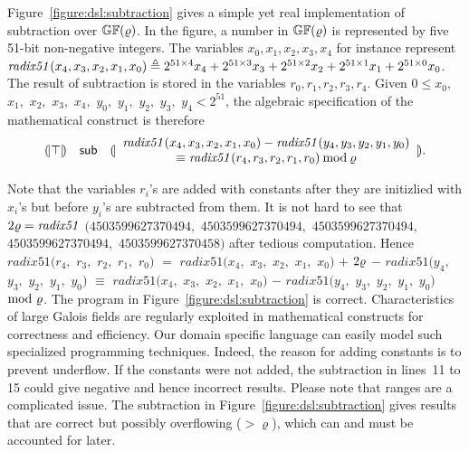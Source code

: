 Figure~\ref{figure:dsl:subtraction} gives a simple yet real
implementation of subtraction over $\mathbb{GF}(\varrho)$. 
In the figure, a number in $\mathbb{GF}(\varrho)$ 
is represented by five 51-bit non-negative integers. The variables
${x}_0, {x}_1, {x}_2, {x}_3, {x}_4$ for instance represent 
$\mathit{radix51}({x}_4, {x}_3, {x}_2, {x}_1, {x}_0) \triangleq
2^{51 \times 4} {x}_4 + 2^{51 \times 3} {x}_3 + 
2^{51 \times 2} {x}_2 + 2^{51 \times 1} {x}_1 + 
2^{51 \times 0} {x}_0$. The result of
subtraction is stored in the variables ${r}_0, {r}_1, {r}_2, {r}_3, {r}_4$. 
Given $0 \leq {x}_0,$ ${x}_1,$ ${x}_2,$ ${x}_3,$ ${x}_4,$ ${y}_0,$ 
${y}_1,$ ${y}_2,$ ${y}_3,$ ${y}_4 < 2^{51}$, 
the algebraic specification of the mathematical construct is therefore
\[
\begin{array}{rcl}
{(\!|}{\top}{|\!)} &
\mbox{\textsf{sub}} &
{(\!|}{
   \begin{array}{c}
     \mathit{radix51}({x}_4, {x}_3, {x}_2, {x}_1, {x}_0) -
     \mathit{radix51}({y}_4, {y}_3, {y}_2, {y}_1, {y}_0)\\
     \equiv 
     \mathit{radix51}({r}_4, {r}_3, {r}_2, {r}_1, {r}_0)
     \mathbin{\textmd{mod}} \varrho
   \end{array}
}{|\!)}.
\end{array}
\]

Note that the variables ${r}_i$'s are added with constants
after they are initizlied with ${x}_i$'s but before
${y}_i$'s are subtracted from them. It is not hard to see that
$2\varrho = \mathit{radix51}$ $(4503599627370494,$ $4503599627370494,$
$4503599627370494,$ $4503599627370494,$ $4503599627370458)$
after tedious computation. Hence $\mathit{radix51}({r}_4,$
${r}_3,$ ${r}_2,$ ${r}_1,$ ${r}_0)$ $=$
$\mathit{radix51}({x}_4,$ ${x}_3,$ ${x}_2,$ ${x}_1,$ ${x}_0)$ $+$ 
$2 \varrho $ $-$
$\mathit{radix51}({y}_4,$ ${y}_3,$ ${y}_2,$ ${y}_1,$ ${y}_0)$ 
$\equiv $
$\mathit{radix51}({x}_4,$ ${x}_3,$ ${x}_2,$ ${x}_1,$ ${x}_0)$ $-$
$\mathit{radix51}({y}_4,$ ${y}_3,$ ${y}_2,$ ${y}_1,$ ${y}_0)$ $\mathbin{\textmd{mod}} 
\ \varrho$. The program in
Figure~\ref{figure:dsl:subtraction} is correct. 
Characteristics of large Galois fields are
regularly exploited in mathematical constructs for correctness and
efficiency. Our domain specific language can easily model such
specialized programming techniques. Indeed,
the reason for
adding constants is to prevent underflow. If the constants were not
added, the subtraction in lines~11 to 15 could give negative and hence
%
incorrect results. {Please note that ranges are a complicated
  issue. The subtraction in Figure~\ref{figure:dsl:subtraction} gives results that are correct
  but possibly {overflowing} ($>\varrho$), which can and must be
  accounted for later.} 

